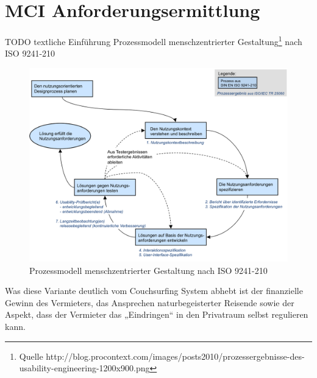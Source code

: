 
\chapter{MCI Anforderungsermittlung}

TODO textliche Einführung
Prozessmodell menschzentrierter Gestaltung\footnote{Quelle http://blog.procontext.com/images/posts2010/prozessergebnisse-des-usability-engineering-1200x900.png} nach ISO 9241-210

\begin{figure}[H]
\includegraphics[width=.9\textwidth]{./images/prozessergebnisse.png}
\caption{Prozessmodell menschzentrierter Gestaltung nach ISO 9241-210 }
\label{prozessmodell}
\end{figure}


Was diese Variante deutlich vom Couchsurfing System abhebt ist der finanzielle Gewinn des Vermieters, das Ansprechen naturbegeisterter Reisende sowie der Aspekt, dass der Vermieter das „Eindringen“ in den Privatraum selbst regulieren kann.

\newpage



\newpage



\newpage



\newpage



\newpage



\newpage
